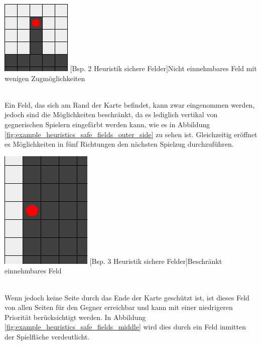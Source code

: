 \documentclass[12pt,a4paper,bibliography=totocnumbered,listof=totocnumbered]{article}
\begin{document}
\vspace{1em}
\begin{minipage}{\linewidth}
	\centering
	\includegraphics[width=0.3\linewidth]{pics/heuristics_safe_fields_dead_end.png}
	[Bsp. 2 Heuristik sichere Felder]{Nicht einnehmbares Feld mit wenigen Zugmöglichkeiten}
	\label{fig:example_heuristics_safe_fields_dead_end}
\end{minipage}
\\

Ein Feld, das sich am Rand der Karte befindet, kann zwar eingenommen werden, jedoch sind die Möglichkeiten beschränkt, da es lediglich vertikal von gegnerischen Spielern eingefärbt werden kann, wie es in Abbildung \ref{fig:example_heuristics_safe_fields_outer_side} zu sehen ist. Gleichzeitig eröffnet es Möglichkeiten in fünf Richtungen den nächsten Spielzug durchzuführen.

\vspace{1em}
\begin{minipage}{\linewidth}
	\centering
	\includegraphics[width=0.3\linewidth]{pics/heuristics_safe_fields_outer_side.png}
	[Bsp. 3 Heuristik sichere Felder]{Beschränkt einnehmbares Feld}
	\label{fig:example_heuristics_safe_fields_outer_side}
\end{minipage}
\\

Wenn jedoch keine Seite durch das Ende der Karte geschützt ist, ist dieses Feld von allen Seiten für den Gegner erreichbar und kann mit einer niedrigeren Priorität berücksichtigt werden. In Abbildung \ref{fig:example_heuristics_safe_fields_middle} wird dies durch ein Feld inmitten der Spielfläche verdeutlicht.
\end{document}

